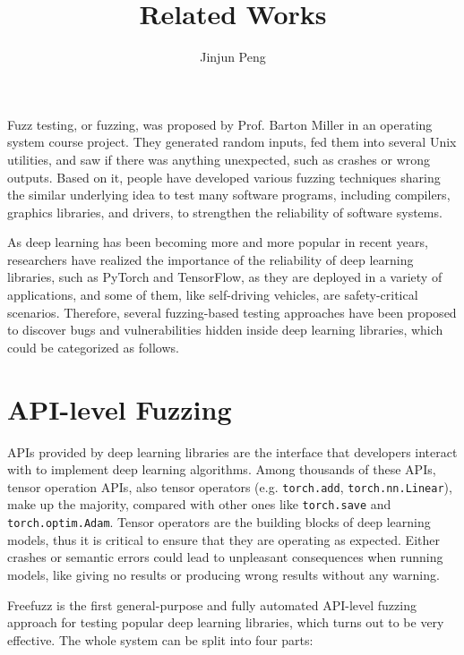 \documentclass{article}
\begin{document}


\title{Related Works}
\author{Jinjun Peng}
\maketitle


Fuzz testing, or fuzzing, was proposed by Prof. Barton Miller in an operating system course project. They generated random inputs, fed them into several Unix utilities, and saw if there was anything unexpected, such as crashes or wrong outputs. Based on it, people have developed various fuzzing techniques sharing the similar underlying idea to test many software programs, including compilers, graphics libraries, and drivers, to strengthen the reliability of software systems.

As deep learning has been becoming more and more popular in recent years, researchers have realized the importance of the reliability of deep learning libraries, such as PyTorch and TensorFlow, as they are deployed in a variety of applications, and some of them, like self-driving vehicles, are safety-critical scenarios. Therefore, several fuzzing-based testing approaches have been proposed to discover bugs and vulnerabilities hidden inside deep learning libraries, which could be categorized as follows.

\section{API-level Fuzzing}

APIs provided by deep learning libraries are the interface that developers interact with to implement deep learning algorithms. Among thousands of these APIs, tensor operation APIs, also tensor operators (e.g. \texttt{torch.add}, \texttt{torch.nn.Linear}), make up the majority, compared with other ones like \texttt{torch.save} and \texttt{torch.optim.Adam}. Tensor operators are the building blocks of deep learning models, thus it is critical to ensure that they are operating as expected. Either crashes or semantic errors could lead to unpleasant consequences when running models, like giving no results or producing wrong results without any warning.

Freefuzz is the first general-purpose and fully automated API-level fuzzing approach for testing popular deep learning libraries, which turns out to be very effective. The whole system can be split into four parts:
\end{document}
